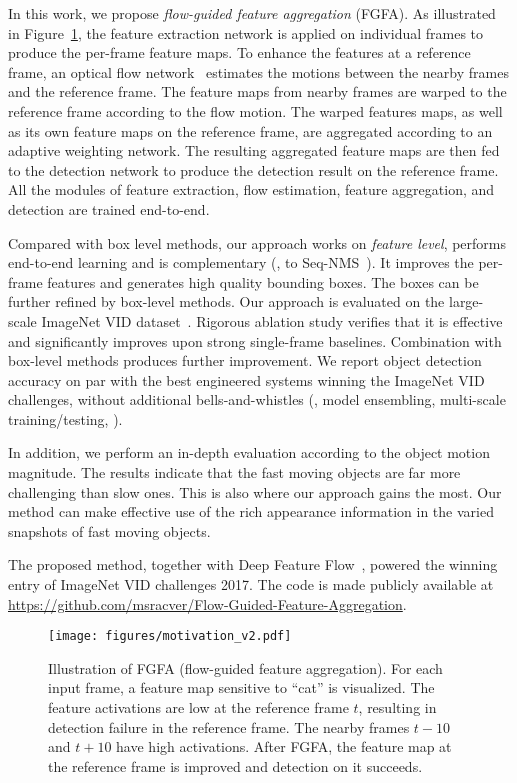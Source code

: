 \documentclass[10pt,twocolumn,letterpaper]{article}
\begin{document}
In this work, we propose \emph{flow-guided feature aggregation} (FGFA). As illustrated in Figure~\ref{fig.motivation}, the feature extraction network is applied on individual frames to produce the per-frame feature maps. To enhance the features at a reference frame, an optical flow network~\cite{dosovitskiy2015flownet} estimates the motions between the nearby frames and the reference frame. The feature maps from nearby frames are warped to the reference frame according to the flow motion. The warped features maps, as well as its own feature maps on the reference frame, are aggregated according to an adaptive weighting network. The resulting aggregated feature maps are then fed to the detection network to produce the detection result on the reference frame. All the modules of feature extraction, flow estimation, feature aggregation, and detection are trained end-to-end.

Compared with box level methods, our approach works on \emph{feature level}, performs end-to-end learning and is complementary (\eg, to Seq-NMS~\cite{han2016seqnms}). It improves the per-frame features and generates high quality bounding boxes. The boxes can be further refined by box-level methods. Our approach is evaluated on the large-scale ImageNet VID dataset~\cite{russakovsky2015imagenet}. Rigorous ablation study verifies that it is effective and significantly improves upon strong single-frame baselines. Combination with box-level methods produces further improvement. We report object detection accuracy on par with the best engineered systems winning the ImageNet VID challenges, without additional bells-and-whistles (\eg, model ensembling, multi-scale training/testing, \etc).

In addition, we perform an in-depth evaluation according to the object motion magnitude. The results indicate that the fast moving objects are far more challenging than slow ones. This is also where our approach gains the most. Our method can make effective use of the rich appearance information in the varied snapshots of fast moving objects.

The proposed method, together with Deep Feature Flow~\cite{zhu2016dff}, powered the winning entry of ImageNet VID challenges 2017. The code is made publicly available at \url{https://github.com/msracver/Flow-Guided-Feature-Aggregation}.

\begin{figure}
\begin{center}
\texttt{[image: figures/motivation\_v2.pdf]}
\end{center}
\label{fig.motivation}
\caption{Illustration of FGFA (flow-guided feature aggregation). For each input frame, a feature map sensitive to ``cat'' is visualized. The feature activations are low at the reference frame $t$, resulting in detection failure in the reference frame. The nearby frames $t-10$ and $t+10$ have high activations. After FGFA, the feature map at the reference frame is improved and detection on it succeeds.} \vspace{-0.7em}
\end{figure}
\end{document}
